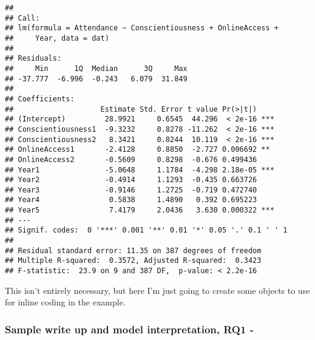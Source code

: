 \documentclass[
]{article}
\newenvironment{Shaded}{\begin{snugshade}}{\end{snugshade}}
\newcommand{\DecValTok}[1]{\textcolor[rgb]{0.00,0.00,0.81}{#1}}
\newcommand{\FunctionTok}[1]{\textcolor[rgb]{0.13,0.29,0.53}{\textbf{#1}}}
\newcommand{\NormalTok}[1]{#1}
\newcommand{\OtherTok}[1]{\textcolor[rgb]{0.56,0.35,0.01}{#1}}
\newcommand{\SpecialCharTok}[1]{\textcolor[rgb]{0.81,0.36,0.00}{\textbf{#1}}}
\newcommand{\StringTok}[1]{\textcolor[rgb]{0.31,0.60,0.02}{#1}}
\begin{document}
\begin{verbatim}
## 
## Call:
## lm(formula = Attendance ~ Conscientiousness + OnlineAccess + 
##     Year, data = dat)
## 
## Residuals:
##     Min      1Q  Median      3Q     Max 
## -37.777  -6.996  -0.243   6.079  31.849 
## 
## Coefficients:
##                    Estimate Std. Error t value Pr(>|t|)    
## (Intercept)         28.9921     0.6545  44.296  < 2e-16 ***
## Conscientiousness1  -9.3232     0.8278 -11.262  < 2e-16 ***
## Conscientiousness2   8.3421     0.8244  10.119  < 2e-16 ***
## OnlineAccess1       -2.4128     0.8850  -2.727 0.006692 ** 
## OnlineAccess2       -0.5609     0.8298  -0.676 0.499436    
## Year1               -5.0648     1.1784  -4.298 2.18e-05 ***
## Year2               -0.4914     1.1293  -0.435 0.663726    
## Year3               -0.9146     1.2725  -0.719 0.472740    
## Year4                0.5838     1.4890   0.392 0.695223    
## Year5                7.4179     2.0436   3.630 0.000322 ***
## ---
## Signif. codes:  0 '***' 0.001 '**' 0.01 '*' 0.05 '.' 0.1 ' ' 1
## 
## Residual standard error: 11.35 on 387 degrees of freedom
## Multiple R-squared:  0.3572, Adjusted R-squared:  0.3423 
## F-statistic:  23.9 on 9 and 387 DF,  p-value: < 2.2e-16
\end{verbatim}

This isn't entirely necessary, but here I'm just going to create some objects to use for inline coding in the example.

\begin{Shaded}
\end{Shaded}

\hypertarget{sample-write-up-and-model-interpretation-rq1--}{%
\subsubsection{Sample write up and model interpretation, RQ1 -}\label{sample-write-up-and-model-interpretation-rq1--}}
\end{document}
